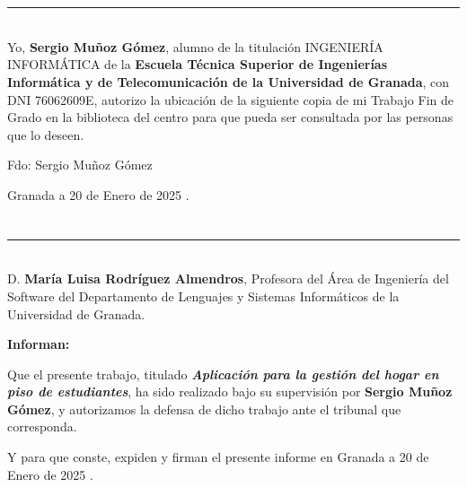 \chapter*{}
\thispagestyle{empty}

\noindent\rule[-1ex]{\textwidth}{2pt}\\[4.5ex]

Yo, \textbf{Sergio Muñoz Gómez}, alumno de la titulación INGENIERÍA INFORMÁTICA de la \textbf{Escuela Técnica Superior
de Ingenierías Informática y de Telecomunicación de la Universidad de Granada}, con DNI 76062609E, autorizo la
ubicación de la siguiente copia de mi Trabajo Fin de Grado en la biblioteca del centro para que pueda ser
consultada por las personas que lo deseen.

\vspace{6cm}

\noindent Fdo: Sergio Muñoz Gómez

\vspace{2cm}

\begin{flushright}
Granada a 20 de Enero de 2025 .
\end{flushright}


\chapter*{}
\thispagestyle{empty}

\noindent\rule[-1ex]{\textwidth}{2pt}\\[4.5ex]

D. \textbf{María Luisa Rodríguez Almendros}, Profesora del Área de Ingeniería del Software del Departamento de Lenguajes y Sistemas Informáticos de la Universidad de Granada.

\vspace{0.5cm}

\textbf{Informan:}

\vspace{0.5cm}

Que el presente trabajo, titulado \textit{\textbf{Aplicación para la gestión del hogar en piso de estudiantes}},
ha sido realizado bajo su supervisión por \textbf{Sergio Muñoz Gómez}, y autorizamos la defensa de dicho trabajo ante el tribunal
que corresponda.

\vspace{0.5cm}

Y para que conste, expiden y firman el presente informe en Granada a 20 de Enero de 2025 .

\vspace{1cm}

